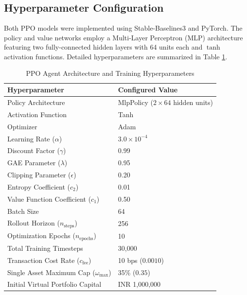 \documentclass[conference]{IEEEtran}
\begin{document}
\subsection{Hyperparameter Configuration}
Both PPO models were implemented using Stable-Baselines3 and PyTorch. The policy and value networks employ a Multi-Layer Perceptron (MLP) architecture featuring two fully-connected hidden layers with 64 units each and $\tanh$ activation functions. Detailed hyperparameters are summarized in Table \ref{tab:hyperparams}.

\begin{table}[htbp]
\caption{PPO Agent Architecture and Training Hyperparameters}
\label{tab:hyperparams}
\centering
\begin{tabular}{ll}
\toprule
\textbf{Hyperparameter} & \textbf{Configured Value} \\
\midrule
Policy Architecture & MlpPolicy ($2 \times 64$ hidden units) \\
Activation Function & Tanh \\
Optimizer & Adam \\
Learning Rate ($\alpha$) & $3.0 \times 10^{-4}$ \\
Discount Factor ($\gamma$) & 0.99 \\
GAE Parameter ($\lambda$) & 0.95 \\
Clipping Parameter ($\epsilon$) & 0.20 \\
Entropy Coefficient ($c_2$) & 0.01 \\
Value Function Coefficient ($c_1$) & 0.50 \\
Batch Size & 64 \\
Rollout Horizon ($n_{\text{steps}}$) & 256 \\
Optimization Epochs ($n_{\text{epochs}}$) & 10 \\
Total Training Timesteps & 30,000 \\
Transaction Cost Rate ($c_{\text{fee}}$) & 10 bps ($0.0010$) \\
Single Asset Maximum Cap ($\omega_{\max}$) & 35\% ($0.35$) \\
Initial Virtual Portfolio Capital & INR 1,000,000 \\
\bottomrule
\end{tabular}
\end{table}
\end{document}
